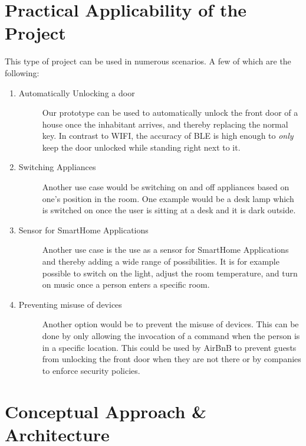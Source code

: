 \documentclass[
10pt, %
a4paper, %
oneside, %
headinclude,footinclude, %
BCOR5mm, %
]{scrartcl}
\begin{document}
\section{Practical Applicability of the Project}
This type of project can be used in numerous scenarios. A few of which are the following:
\begin{enumerate}
\item 
	\begin{description}
	\item[Automatically Unlocking a door] Our prototype can be used to automatically unlock the front door of a house once the inhabitant arrives, and thereby replacing the normal key. In contrast to WIFI, the accuracy of BLE is high enough to \emph{only} keep the door unlocked while standing right next to it.
	\end{description}
	\item 
	\begin{description}
	\item[Switching Appliances] Another use case would be switching on and off appliances based on one's position in the room. One example would be a desk lamp which is switched on once the user is sitting at a desk and it is dark outside.
	\end{description}
	\item
	\begin{description}
	\item[Sensor for SmartHome Applications] Another use case is the use as a sensor for SmartHome Applications and thereby adding a wide range of possibilities. It is for example possible to switch on the light, adjust the room temperature, and turn on music once a person enters a specific room.
	\end{description}
	\item
	\begin{description}
	\item[Preventing misuse of devices] Another option would be to prevent the misuse of devices. This can be done by only allowing the invocation of a command when the person is in a specific location. This could be used by AirBnB to prevent guests from unlocking the front door when they are not there or by companies to enforce security policies.
	\end{description}
\end{enumerate}

\section{Conceptual Approach \& Architecture}
\end{document}
